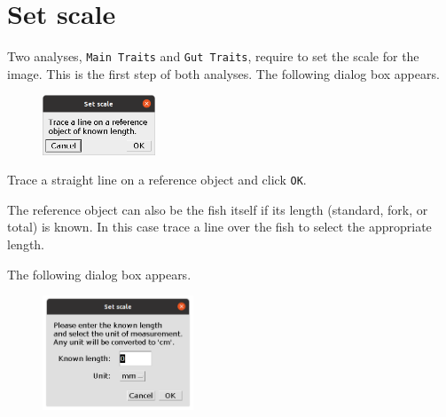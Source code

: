 \documentclass[
  letterpaper,
  DIV=11,
  numbers=noendperiod,
  oneside]{scrreprt}
\begin{document}
\hypertarget{sec-set_scale}{%
\chapter{Set scale}\label{sec-set_scale}}

Two analyses, \texttt{Main\ Traits} and \texttt{Gut\ Traits}, require to
set the scale for the image. This is the first step of both analyses.
The following dialog box appears.

\begin{figure}

{\centering \includegraphics[width=0.3\textwidth,height=\textheight]{./images/screenshots/set_scale_info.png}

}

\end{figure}

Trace a straight line on a reference object and click \texttt{OK}.

\begin{tcolorbox}[standard jigsaw,arc=.35mm, toptitle=1mm, titlerule=0mm, bottomtitle=1mm, left=2mm, colbacktitle=quarto-callout-tip-color!10!white, colback=white, opacityback=0, leftrule=.75mm, title=\textcolor{quarto-callout-tip-color}{\faLightbulb}\hspace{0.5em}{Tip}, coltitle=black, rightrule=.15mm, bottomrule=.15mm, toprule=.15mm, opacitybacktitle=0.6, colframe=quarto-callout-tip-color-frame]
The reference object can also be the fish itself if its length
(standard, fork, or total) is known. In this case trace a line over the
fish to select the appropriate length.
\end{tcolorbox}

The following dialog box appears.

\begin{figure}

{\centering \includegraphics[width=0.4\textwidth,height=\textheight]{./images/screenshots/set_scale_dialog.png}

}

\end{figure}
\end{document}
